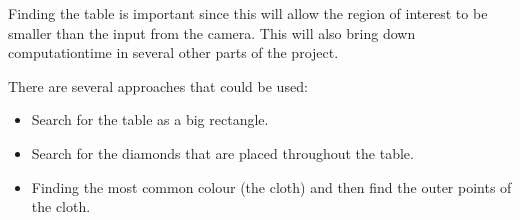 Finding the table is important since this will allow the region of interest to be smaller than the input from the camera. This will also bring down computationtime in several other parts of the project.

There are several approaches that could be used:
\begin{itemize}
	\item Search for the table as a big rectangle.
	\item Search for the diamonds that are placed throughout the table.
	\item Finding the most common colour (the cloth) and then find the outer points of the cloth.
\end{itemize}


